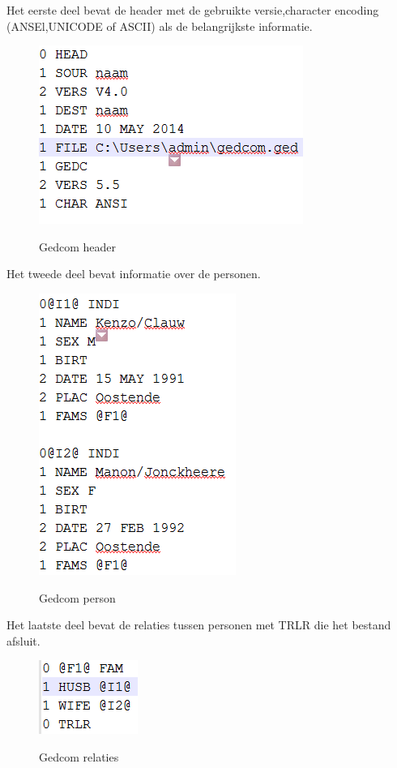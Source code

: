 \documentclass[pdftex,a4paper,12pt,twoside]{report}
\begin{document}
Het eerste deel bevat de header met de gebruikte versie,character encoding (ANSEl,UNICODE of ASCII) als de belangrijkste informatie.

\begin{figure}[!htb]
\includegraphics{images/gedcomheader.png}\\
\caption{Gedcom header}
\end{figure}

Het tweede deel bevat informatie over de personen.

\begin{figure}[!htb]
\includegraphics{images/gedcomperson.png}\\
\caption{Gedcom person}
\end{figure}

Het laatste deel bevat de relaties tussen personen met TRLR die het bestand afsluit.

\begin{figure}[!htb]
\includegraphics{images/gedcomrelaties.png}\\
\caption{Gedcom relaties}
\end{figure}
\end{document}
